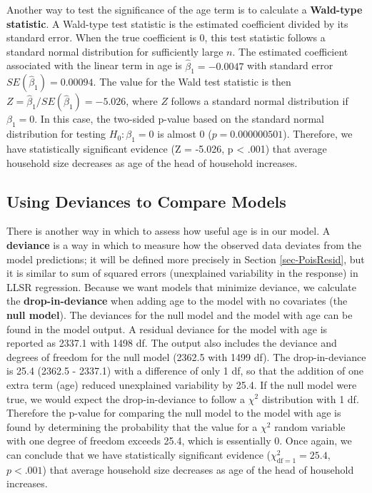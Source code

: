 \documentclass[
]{krantz}
\begin{document}
Another way to test the significance of the age term is to calculate a \textbf{Wald-type statistic}.  A Wald-type test statistic is the estimated coefficient divided by its standard error. When the true coefficient is 0, this test statistic follows a standard normal distribution for sufficiently large \(n\). The estimated coefficient associated with the linear term in age is \({\hat{\beta}_1}=-0.0047\) with standard error \(SE(\hat{\beta}_1)=0.00094\). The value for the Wald test statistic is then \(Z=\hat{\beta}_1/SE(\hat{\beta}_1)=-5.026\), where \(Z\) follows a standard normal distribution if \(\beta_1=0\). In this case, the two-sided p-value based on the standard normal distribution for testing \(H_0:\beta_1=0\) is almost 0 (\(p=0.000000501\)). Therefore, we have statistically significant evidence (Z = -5.026, p \textless{} .001) that average household size decreases as age of the head of household increases.

\hypertarget{sec-Devtocompare}{%
\subsection{Using Deviances to Compare Models}\label{sec-Devtocompare}}

There is another way in which to assess how useful age is in our model. A \textbf{deviance}  is a way in which to measure how the observed data deviates from the model predictions; it will be defined more precisely in Section \ref{sec-PoisResid}, but it is similar to sum of squared errors (unexplained variability in the response) in LLSR regression. Because we want models that minimize deviance, we calculate the \textbf{drop-in-deviance}  when adding age to the model with no covariates (the \textbf{null model}).  The deviances for the null model and the model with age can be found in the model output. A residual deviance for the model with age is reported as 2337.1 with 1498 df. The output also includes the deviance and degrees of freedom for the null model (2362.5 with 1499 df). The drop-in-deviance is 25.4 (2362.5 - 2337.1) with a difference of only 1 df, so that the addition of one extra term (age) reduced unexplained variability by 25.4. If the null model were true, we would expect the drop-in-deviance to follow a \(\chi^2\) distribution with 1 df. Therefore the p-value for comparing the null model to the model with age is found by determining the probability that the value for a \(\chi^2\) random variable with one degree of freedom exceeds 25.4, which is essentially 0. Once again, we can conclude that we have statistically significant evidence (\(\chi^2_{\text{df} =1}=25.4\), \(p < .001\)) that average household size decreases as age of the head of household increases.
\end{document}
